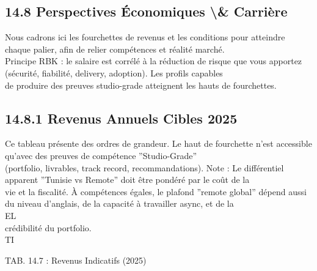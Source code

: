 \documentclass[12pt,landscape,a4paper]{article}
\begin{document}
\subsection{14.8 Perspectives Économiques \textbackslash{}& Carrière}
Nous cadrons ici les fourchettes de revenus et les conditions pour atteindre chaque palier, afin de relier compétences et réalité marché.\\
Principe RBK : le salaire est corrélé à la réduction de risque que vous apportez (sécurité, fiabilité, delivery, adoption). Les profils capables\\
de produire des preuves studio-grade atteignent les hauts de fourchettes.\\
\vspace{0.5em}
\vspace{0.5em}
\subsection{14.8.1 Revenus Annuels Cibles 2025}
Ce tableau présente des ordres de grandeur. Le haut de fourchette n’est accessible qu’avec des preuves de compétence ”Studio-Grade”\\
(portfolio, livrables, track record, recommandations). Note : Le différentiel apparent ”Tunisie vs Remote” doit être pondéré par le coût de la\\
vie et la fiscalité. À compétences égales, le plafond ”remote global” dépend aussi du niveau d’anglais, de la capacité à travailler async, et de la\\
\vspace{0.5em}
\vspace{0.5em}
\vspace{0.5em}
\vspace{0.5em}
EL\\
crédibilité du portfolio.\\
\vspace{0.5em}
\vspace{0.5em}
\vspace{0.5em}
\vspace{0.5em}
TI\\
\begin{center}\begin{tabular}TAB. 14.7 : Revenus Indicatifs (2025)\end{tabular}\end{center}
\vspace{0.5em}
\vspace{0.5em}
\vspace{0.5em}
\vspace{0.5em}
\end{document}
